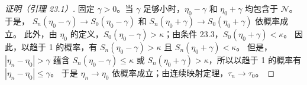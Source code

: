 \begin{proof}[证明（引理 23.1）]
固定 $\gamma>0$。当 $\gamma$ 足够小时，$\eta_0-\gamma$ 和 $\eta_0+\gamma$ 均包含于 $\mathcal N$。于是，
$S_n(\eta_0-\gamma)\to S_0(\eta_0-\gamma)$ 和 $S_n(\eta_0+\gamma)\to S_0(\eta_0+\gamma)$ 依概率成立。
此外，由 $\eta_0$ 的定义，$S_0(\eta_0-\gamma)>\kappa$；由条件 23.3，$S_0(\eta_0+\gamma)<\kappa$。
因此，以趋于 1 的概率，有 $S_n(\eta_0-\gamma)>\kappa$ 且 $S_n(\eta_0+\gamma)<\kappa$。
但是，$|\eta_n-\eta_0|>\gamma$ 蕴含 $S_n(\eta_0-\gamma)\leq\kappa$ 或 $S_n(\eta_0+\gamma)>\kappa$，所以以趋于 1 的概率有 $|\eta_n-\eta_0|\leq\gamma$。
于是 $\eta_n\to\eta_0$ 依概率成立；由连续映射定理，$\tau_n\to\tau_0$。
\end{proof}
